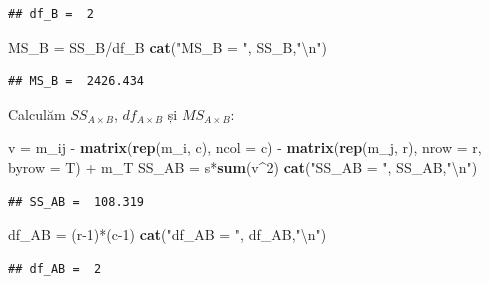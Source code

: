\documentclass[]{article}
\newenvironment{Shaded}{\begin{snugshade}}{\end{snugshade}}
\newcommand{\KeywordTok}[1]{\textcolor[rgb]{0.13,0.29,0.53}{\textbf{{#1}}}}
\newcommand{\DataTypeTok}[1]{\textcolor[rgb]{0.13,0.29,0.53}{{#1}}}
\newcommand{\DecValTok}[1]{\textcolor[rgb]{0.00,0.00,0.81}{{#1}}}
\newcommand{\CharTok}[1]{\textcolor[rgb]{0.31,0.60,0.02}{{#1}}}
\newcommand{\StringTok}[1]{\textcolor[rgb]{0.31,0.60,0.02}{{#1}}}
\newcommand{\NormalTok}[1]{{#1}}
\begin{document}
\begin{verbatim}
## df_B =  2
\end{verbatim}

\begin{Shaded}
\begin{Highlighting}[]
\NormalTok{MS_B =}\StringTok{ }\NormalTok{SS_B/df_B}
\KeywordTok{cat}\NormalTok{(}\StringTok{"MS_B = "}\NormalTok{, SS_B,}\StringTok{"}\CharTok{\textbackslash{}n}\StringTok{"}\NormalTok{)}
\end{Highlighting}
\end{Shaded}

\begin{verbatim}
## MS_B =  2426.434
\end{verbatim}

Calculăm \(SS_{A\times B}\), \(df_{A\times B}\) și \(MS_{A\times B}\):

\begin{Shaded}
\begin{Highlighting}[]
\NormalTok{v =}\StringTok{ }\NormalTok{m_ij -}\StringTok{ }\KeywordTok{matrix}\NormalTok{(}\KeywordTok{rep}\NormalTok{(m_i, c), }\DataTypeTok{ncol =} \NormalTok{c) -}\StringTok{ }
\StringTok{  }\KeywordTok{matrix}\NormalTok{(}\KeywordTok{rep}\NormalTok{(m_j, r), }\DataTypeTok{nrow =} \NormalTok{r, }\DataTypeTok{byrow =} \NormalTok{T) +}\StringTok{ }\NormalTok{m_T}
\NormalTok{SS_AB =}\StringTok{ }\NormalTok{s*}\KeywordTok{sum}\NormalTok{(v^}\DecValTok{2}\NormalTok{)}
\KeywordTok{cat}\NormalTok{(}\StringTok{"SS_AB = "}\NormalTok{, SS_AB,}\StringTok{"}\CharTok{\textbackslash{}n}\StringTok{"}\NormalTok{)}
\end{Highlighting}
\end{Shaded}

\begin{verbatim}
## SS_AB =  108.319
\end{verbatim}

\begin{Shaded}
\begin{Highlighting}[]
\NormalTok{df_AB =}\StringTok{ }\NormalTok{(r}\DecValTok{-1}\NormalTok{)*(c}\DecValTok{-1}\NormalTok{)}
\KeywordTok{cat}\NormalTok{(}\StringTok{"df_AB = "}\NormalTok{, df_AB,}\StringTok{"}\CharTok{\textbackslash{}n}\StringTok{"}\NormalTok{)}
\end{Highlighting}
\end{Shaded}

\begin{verbatim}
## df_AB =  2
\end{verbatim}
\end{document}
